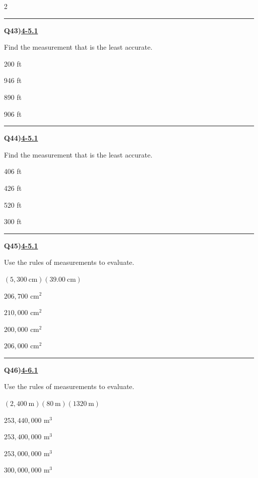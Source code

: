 \documentclass[11pt]{article}
\newenvironment{Qbox}[2]{%
  \par\medskip\noindent\begin{minipage}{\linewidth}%
  \hrule\medskip%
  \textbf{Q#1)}\hfill\textbf{\underline{#2}}\par\smallskip%
}{\par\end{minipage}\par\medskip}
\begin{document}
\begin{multicols}{2}
\begin{Qbox}{43}{4-5.1}
Find the measurement that is the least accurate.
\begin{choices}
  \item 200 ft
  \item 946 ft
  \item 890 ft
  \item 906 ft
\end{choices}
\end{Qbox}

\begin{Qbox}{44}{4-5.1}
Find the measurement that is the least accurate.
\begin{choices}
  \item 406 ft
  \item 426 ft
  \item 520 ft
  \item 300 ft
\end{choices}
\end{Qbox}

\begin{Qbox}{45}{4-5.1}
Use the rules of measurements to evaluate.\par\medskip $(5{,}300\ \text{cm})(39.00\ \text{cm})$
\begin{choices}
  \item $206{,}700$ cm$^2$
  \item $210{,}000$ cm$^2$
  \item $200{,}000$ cm$^2$
  \item $206{,}000$ cm$^2$
\end{choices}
\end{Qbox}

\begin{Qbox}{46}{4-6.1}
Use the rules of measurements to evaluate.\par\medskip $(2{,}400\ \text{m})(80\ \text{m})(1320\ \text{m})$
\begin{choices}
  \item $253{,}440{,}000$ m$^3$
  \item $253{,}400{,}000$ m$^3$
  \item $253{,}000{,}000$ m$^3$
  \item $300{,}000{,}000$ m$^3$
\end{choices}
\end{Qbox}


\end{multicols}
\end{document}
